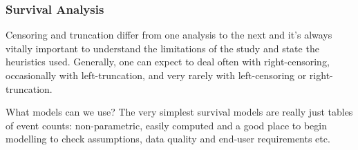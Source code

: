 \begin{frame}
	\frametitle{Survival Analysis}
	Censoring and truncation differ from one analysis to the next and it's always vitally important to understand the limitations of the study and state the heuristics used. Generally, one can expect to deal often with right-censoring, occasionally with left-truncation, and very rarely with left-censoring or right-truncation.
	
	What models can we use?
	The very simplest survival models are really just tables of event counts: non-parametric, easily computed and a good place to begin modelling to check assumptions, data quality and end-user requirements etc.
\end{frame}


